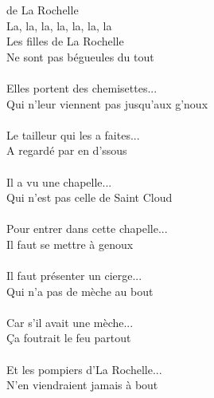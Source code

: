 
 de La Rochelle
\\ La, la, la, la, la, la, la
\\Les filles de La Rochelle
\\Ne sont pas bégueules du tout ~~~~\bissimple
\\\\Elles portent des chemisettes...
\\Qui n'leur viennent pas jusqu'aux g'noux ~\bissimple
\\\\Le tailleur qui les a faites...
\\A regardé par en d'ssous ~~~~~~~~~~~~\bissimple
\\\\Il a vu une chapelle...
\\Qui n'est pas celle de Saint Cloud \bissimple
\\\\Pour entrer dans cette chapelle...
\\Il faut se mettre à genoux ~~~~~~~~~~\bissimple
\\\\Il faut présenter un cierge...
\\Qui n'a pas de mèche au bout  ~~~~~\bissimple
\\\\Car s'il avait une mèche...
\\Ça foutrait le feu partout  ~~~~~~~~~~~~\bissimple
\\\\Et les pompiers d'La Rochelle...
\\N'en viendraient jamais à bout  ~~~~~\bissimple
\\
\breakpage